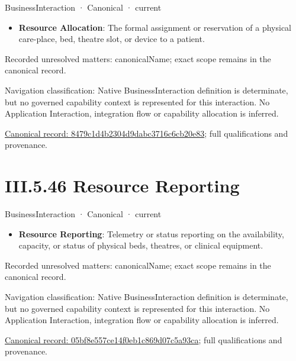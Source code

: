 \label{element:8479c1d4b2304d9dabc3716c6cb20e83}
{\small BusinessInteraction · Canonical · current}\par

\begin{itemize}


\item \textbf{Resource Allocation}: The formal assignment or reservation of a physical care-place, bed, theatre slot, or device to a patient.

\end{itemize}

{\small Recorded unresolved matters: canonicalName; exact scope remains in the canonical record.}\par
{\small Navigation classification: Native BusinessInteraction definition is determinate, but no governed capability context is represented for this interaction. No Application Interaction, integration flow or capability allocation is inferred.}\par
{\footnotesize \href{../../../../../../../../continuum/business/business-interaction/8479c1d4b2304d9dabc3716c6cb20e83.md}{Canonical record: 8479c1d4b2304d9dabc3716c6cb20e83}; full qualifications and provenance.}\par
\section*{III.5.46 Resource Reporting}
\label{navigation:III.5.46}

\label{element:05bf8e557ce14f0eb1c869d07c5a93ca}
{\small BusinessInteraction · Canonical · current}\par

\begin{itemize}


\item \textbf{Resource Reporting}: Telemetry or status reporting on the availability, capacity, or status of physical beds, theatres, or clinical equipment.

\end{itemize}

{\small Recorded unresolved matters: canonicalName; exact scope remains in the canonical record.}\par
{\small Navigation classification: Native BusinessInteraction definition is determinate, but no governed capability context is represented for this interaction. No Application Interaction, integration flow or capability allocation is inferred.}\par
{\footnotesize \href{../../../../../../../../continuum/business/business-interaction/05bf8e557ce14f0eb1c869d07c5a93ca.md}{Canonical record: 05bf8e557ce14f0eb1c869d07c5a93ca}; full qualifications and provenance.}\par
